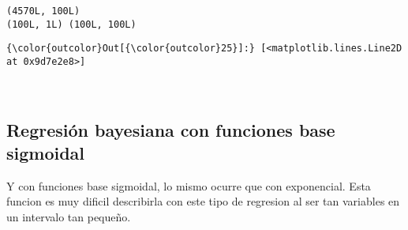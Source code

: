 \documentclass[11pt]{article}
\begin{document}
    \begin{Verbatim}[commandchars=\\\{\}]
(4570L, 100L)
(100L, 1L) (100L, 100L)

    \end{Verbatim}

\begin{Verbatim}[commandchars=\\\{\}]
{\color{outcolor}Out[{\color{outcolor}25}]:} [<matplotlib.lines.Line2D at 0x9d7e2e8>]
\end{Verbatim}
            
    \begin{center}
    \end{center}
    { \hspace*{\fill} \\}
    
    \subsection{Regresión bayesiana con funciones base
sigmoidal}\label{regresiuxf3n-bayesiana-con-funciones-base-sigmoidal}

    Y con funciones base sigmoidal, lo mismo ocurre que con exponencial.
Esta funcion es muy dificil describirla con este tipo de regresion al
ser tan variables en un intervalo tan pequeño.
\end{document}
